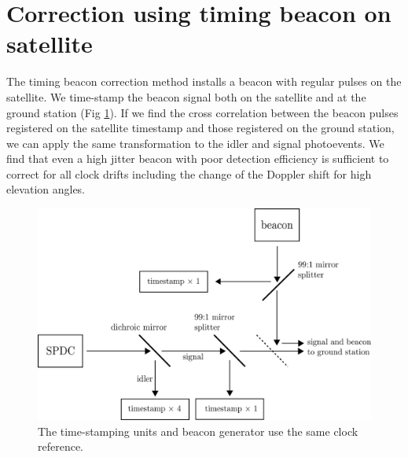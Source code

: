 \section{Correction using timing beacon on satellite}
The timing beacon correction method installs a beacon with regular pulses on the satellite. We time-stamp the beacon signal both on the satellite and at the ground station (Fig \ref{fig:beacon}). If we find the cross correlation between the beacon pulses registered on the satellite timestamp and those registered on the ground station, we can apply the same transformation to the idler and signal photoevents. We find that even a high jitter beacon with poor detection efficiency is sufficient to correct for all clock drifts including the change of the Doppler shift for high elevation angles.

\begin{figure}[ht!]
	\includegraphics[width=0.97\linewidth]{assets/beacon}
	\caption{The time-stamping units and beacon generator use the same clock reference.}
	\label{fig:beacon}
\end{figure}

